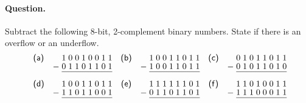 \paragraph{Question.} Subtract the following 8-bit, 2-complement
binary numbers. State if there is an overflow or an underflow.
\[
\renewcommand\arraystretch{0.85}
\begin{array}{lr@{\;}c@{\;}c@{\;}c@{\;}c@{\;}c@{\;}c@{\;}c@{\;}c@{}lcr@{\;}c@{\;}c@{\;}c@{\;}c@{\;}c@{\;}c@{\;}c@{\;}c@{}lcr@{\;}c@{\;}c@{\;}c@{\;}c@{\;}c@{\;}c@{\;}c@{\;}c@{}}
\textsf{(a)} &   & 1&0&0&1&0&0&1&1 & &
\textsf{(b)} &   & 1&0&0&1&1&0&1&1 & &
\textsf{(c)} &   & 0&1&0&1&1&0&1&1\\
             & - & 0&1&1&0&1&1&0&1 & &
             & - & 1&0&0&1&1&0&1&1 & &
             & - & 0&1&0&1&1&0&1&0\\
\cline{3-10}\cline{14-21}\cline{25-32}\\
\textsf{(d)} &   & 1&0&0&1&1&0&1&1 & &
\textsf{(e)} &   & 1&1&1&1&1&1&0&1 & &
\textsf{(f)} &   & 1&1&0&1&0&0&1&1\\
             & - & 1&1&0&1&1&0&0&1 & &
             & - & 0&1&1&0&1&1&0&1 & &
             & - & 1&1&1&0&0&0&1&1\\
\cline{3-10}\cline{14-21}\cline{25-32}
\end{array}
\]
